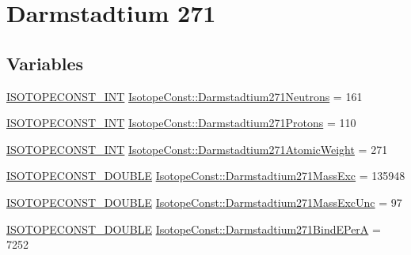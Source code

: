 \hypertarget{group___isotope_const-_darmstadtium-_ds271}{}\section{Darmstadtium 271}
\label{group___isotope_const-_darmstadtium-_ds271}
\subsection*{Variables}
\begin{DoxyCompactItemize}
\item 
\mbox{\hyperlink{group___isotope_const-_macros_ga5f18360b3e99483a35c32d789e62621c}{I\+S\+O\+T\+O\+P\+E\+C\+O\+N\+S\+T\+\_\+\+I\+NT}} \mbox{\hyperlink{group___isotope_const-_darmstadtium-_ds271_ga3657228717ac6d3685b8dc66f4a0fc56}{Isotope\+Const\+::\+Darmstadtium271\+Neutrons}} = 161
\item 
\mbox{\hyperlink{group___isotope_const-_macros_ga5f18360b3e99483a35c32d789e62621c}{I\+S\+O\+T\+O\+P\+E\+C\+O\+N\+S\+T\+\_\+\+I\+NT}} \mbox{\hyperlink{group___isotope_const-_darmstadtium-_ds271_gade86ed138ecce12e1c50b889ae345b4a}{Isotope\+Const\+::\+Darmstadtium271\+Protons}} = 110
\item 
\mbox{\hyperlink{group___isotope_const-_macros_ga5f18360b3e99483a35c32d789e62621c}{I\+S\+O\+T\+O\+P\+E\+C\+O\+N\+S\+T\+\_\+\+I\+NT}} \mbox{\hyperlink{group___isotope_const-_darmstadtium-_ds271_ga30d3cde4e607de388cc946525573835b}{Isotope\+Const\+::\+Darmstadtium271\+Atomic\+Weight}} = 271
\item 
\mbox{\hyperlink{group___isotope_const-_macros_ga8f45a7272ce02c0b4c65c44636ed719a}{I\+S\+O\+T\+O\+P\+E\+C\+O\+N\+S\+T\+\_\+\+D\+O\+U\+B\+LE}} \mbox{\hyperlink{group___isotope_const-_darmstadtium-_ds271_gab8350b28f11bdec6c7fce8f61d871fab}{Isotope\+Const\+::\+Darmstadtium271\+Mass\+Exc}} = 135948
\item 
\mbox{\hyperlink{group___isotope_const-_macros_ga8f45a7272ce02c0b4c65c44636ed719a}{I\+S\+O\+T\+O\+P\+E\+C\+O\+N\+S\+T\+\_\+\+D\+O\+U\+B\+LE}} \mbox{\hyperlink{group___isotope_const-_darmstadtium-_ds271_ga68a8db572bf080118132d55c1865d398}{Isotope\+Const\+::\+Darmstadtium271\+Mass\+Exc\+Unc}} = 97
\item 
\mbox{\hyperlink{group___isotope_const-_macros_ga8f45a7272ce02c0b4c65c44636ed719a}{I\+S\+O\+T\+O\+P\+E\+C\+O\+N\+S\+T\+\_\+\+D\+O\+U\+B\+LE}} \mbox{\hyperlink{group___isotope_const-_darmstadtium-_ds271_gaf1129c5e89a7e16aa22abd02b0456f40}{Isotope\+Const\+::\+Darmstadtium271\+Bind\+E\+PerA}} = 7252

\end{DoxyCompactItemize}
